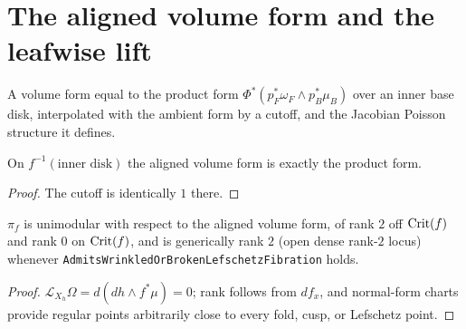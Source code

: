 \chapter{The aligned volume form and the leafwise lift}
\label{chap_lift}

\begin{definition}
\label{def_aligned}
\leanok
{}
A volume form equal to the product form $\Phi^*(p_F^*\omega_F\wedge p_B^*\mu_B)$ over an inner
base disk, interpolated with the ambient form by a cutoff, and the Jacobian Poisson structure it
defines.
\end{definition}

\begin{lemma}
\label{lem_eq1}
\leanok
{}
On $f^{-1}(\text{inner disk})$ the aligned volume form is exactly the product form.
\end{lemma}
\begin{proof}\leanok
The cutoff is identically $1$ there.
\end{proof}

\begin{theorem}
\label{thm_pi_f}
\leanok
{}
$\pi_f$ is unimodular with respect to the aligned volume form, of rank $2$ off $\mathrm{Crit}(f)$ and rank
$0$ on $\mathrm{Crit}(f)$, and is generically rank $2$ (open dense rank-$2$ locus) whenever
\texttt{AdmitsWrinkledOrBrokenLefschetzFibration} holds.
\end{theorem}
\begin{proof}\leanok
$\mathcal L_{X_h}\Omega=d(dh\wedge f^*\mu)=0$; rank follows from $df_x$, and normal-form charts
provide regular points arbitrarily close to every fold, cusp, or Lefschetz point.
\end{proof}

